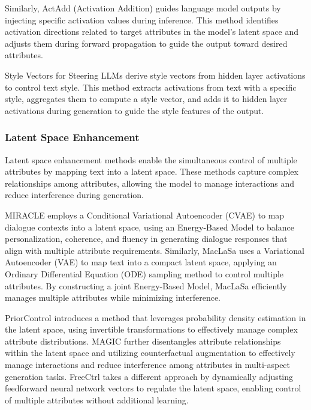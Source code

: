 \documentclass[acmsmall, screen]{acmart}
\begin{document}
Similarly, ActAdd (Activation Addition) \cite{turner_arxiv24_actadd} guides language model outputs by injecting specific activation values during inference. This method identifies activation directions related to target attributes in the model's latent space and adjusts them during forward propagation to guide the output toward desired attributes.

Style Vectors for Steering LLMs \cite{konen_acl24_StyleVectors} derive style vectors from hidden layer activations to control text style. This method extracts activations from text with a specific style, aggregates them to compute a style vector, and adds it to hidden layer activations during generation to guide the style features of the output.

\subsubsection{\textbf{Latent Space Enhancement}} 
Latent space enhancement methods enable the simultaneous control of multiple attributes by mapping text into a latent space. These methods capture complex relationships among attributes, allowing the model to manage interactions and reduce interference during generation.

MIRACLE \cite{lu_acl23_miracle} employs a Conditional Variational Autoencoder (CVAE) to map dialogue contexts into a latent space, using an Energy-Based Model to balance personalization, coherence, and fluency in generating dialogue responses that align with multiple attribute requirements.
Similarly, MacLaSa \cite{ding_acl23_maclasa} uses a Variational Autoencoder (VAE) to map text into a compact latent space, applying an Ordinary Differential Equation (ODE) sampling method to control multiple attributes. By constructing a joint Energy-Based Model, MacLaSa efficiently manages multiple attributes while minimizing interference.

PriorControl \cite{gu_emnlp23_PriorControl} introduces a method that leverages probability density estimation in the latent space, using invertible transformations to effectively manage complex attribute distributions. 
MAGIC \cite{liu_acl24_MAGIC} further disentangles attribute relationships within the latent space and utilizing counterfactual augmentation to effectively manage interactions and reduce interference among attributes in multi-aspect generation tasks.
FreeCtrl \cite{feng_acl24_freectrl} takes a different approach by dynamically adjusting feedforward neural network vectors to regulate the latent space, enabling control of multiple attributes without additional learning.
\end{document}
